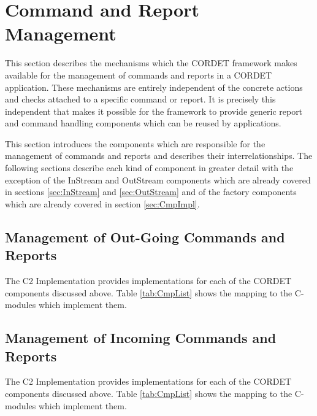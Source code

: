 \documentclass{pnp_article}
\begin{document}
\section{Command and Report Management}\label{sec:CmdAndRepManagement}
This section describes the mechanisms which the CORDET framework makes available for the management of commands and reports in a CORDET application. These mechanisms are entirely independent of the concrete actions and checks attached to a specific command or report. It is precisely this independent that makes it possible for the framework to provide generic report and command handling components which can be reused by applications.

This section introduces the components which are responsible for the management of commands and reports and describes their interrelationships. The following sections describe each kind of component in greater detail with the exception of the InStream and OutStream components which are already covered in sections \ref{sec:InStream} and \ref{sec:OutStream} and of the factory components which are already covered in section \ref{sec:CmpImpl}.

\subsection{Management of Out-Going Commands and Reports}\label{sec:ManagementOfOutGoingCmdAndRep}


The C2 Implementation provides implementations for each of the CORDET components discussed above. Table \ref{tab:CmpList} shows the mapping to the C-modules which implement them.

\subsection{Management of Incoming Commands and Reports}\label{sec:ManagementOfIncomingCmdAndRep}


The C2 Implementation provides implementations for each of the CORDET components discussed above. Table \ref{tab:CmpList} shows the mapping to the C-modules which implement them.
\end{document}
